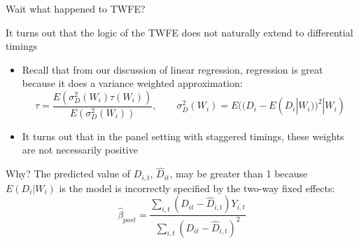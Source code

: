 \documentclass[notes,11pt, aspectratio=169]{beamer}
\newenvironment{wideitemize}{\itemize\addtolength{\itemsep}{10pt}}{\enditemize}
\begin{document}
\begin{frame}{Wait what happened to TWFE?}
  \begin{wideitemize}
  \item It turns out that the logic of the TWFE does not naturally extend to differential timings
    \begin{itemize}
    \item Recall that from our discussion of linear regression, regression is great because it does a variance weighted approximation:
      \begin{equation*}
        \tau = \frac{E(\sigma^{2}_{D}(W_{i})\tau(W_{i}))}{E(\sigma^{2}_{D}(W_{i}))}, \qquad \sigma^{2}_{D}(W_{i}) = E((D_{i} - E(D_{i}|W_{i}))^{2} | W_{i})
      \end{equation*}
  \item It turns out that in the panel setting with staggered timings,
    these weights are not necessarily positive
  \end{itemize}
\item Why? The predicted value of $D_{i,t}$, $\hat{D}_{it}$, may be
  greater than 1 because $E(D_{i}|W_{i})$ is the model is incorrectly specified by
  the two-way fixed effects:
  \begin{equation*}
    \hat{\beta}_{post} = \frac{\sum_{i,t}(D_{it}- \hat{D}_{i,t})Y_{i,t}}{\sum_{i,t}(D_{it}- \hat{D}_{i,t})^{2}}
  \end{equation*}
\end{wideitemize}
\end{frame}
\end{document}
